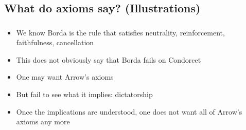 \documentclass[french,english]{beamer}
\begin{document}
\subsection{What do axioms say? (Illustrations)}
\begin{frame}
	\frametitle{\subsecname}
	\begin{example}[Borda]
		\begin{itemize}
			\item We know Borda is the rule that satisfies neutrality, reinforcement, faithfulness, cancellation
			\item This does not obviously say that Borda fails on Condorcet
		\end{itemize}
	\end{example}
	\begin{example}[Dictatorship]
		\begin{itemize}
			\item One may want Arrow’s axioms
			\item But fail to see what it implies: dictatorship
			\item Once the implications are understood, one does not want all of Arrow’s axioms any more
		\end{itemize}
	\end{example}
\end{frame}
\end{document}
